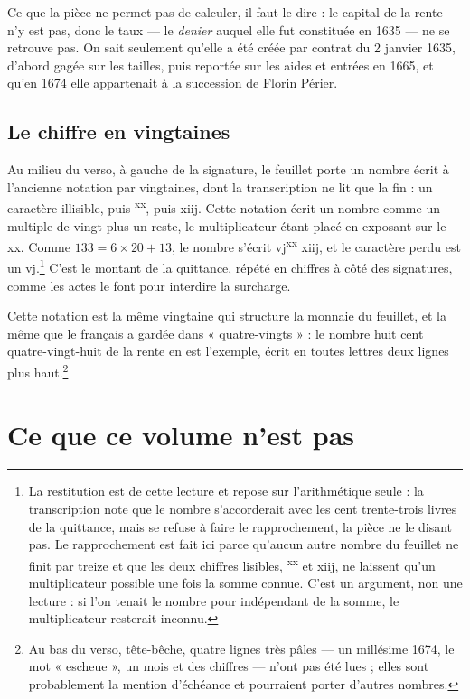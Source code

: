 \documentclass[11pt,a4paper]{article}
\begin{document}
Ce que la pièce ne permet pas de calculer, il faut le dire : le capital de la
rente n'y est pas, donc le taux — le \emph{denier} auquel elle fut constituée
en 1635 — ne se retrouve pas. On sait seulement qu'elle a été créée par
contrat du 2 janvier 1635, d'abord gagée sur les tailles, puis reportée sur
les aides et entrées en 1665, et qu'en 1674 elle appartenait à la succession
de Florin Périer.

\subsection*{Le chiffre en vingtaines}

Au milieu du verso, à gauche de la signature, le feuillet porte un nombre
écrit à l'ancienne notation par vingtaines, dont la transcription ne lit que
la fin : un caractère illisible, puis \textsuperscript{xx}, puis xiij. Cette
notation écrit un nombre comme un multiple de vingt plus un reste, le
multiplicateur étant placé en exposant sur le xx. Comme $133 = 6 \times 20 +
13$, le nombre s'écrit vj\textsuperscript{xx} xiij, et le caractère perdu est
un vj.\footnote{La restitution est de cette lecture et repose sur
l'arithmétique seule : la transcription note que le nombre s'accorderait avec
les cent trente-trois livres de la quittance, mais se refuse à faire le
rapprochement, la pièce ne le disant pas. Le rapprochement est fait ici parce
qu'aucun autre nombre du feuillet ne finit par treize et que les deux chiffres
lisibles, \textsuperscript{xx} et xiij, ne laissent qu'un multiplicateur
possible une fois la somme connue. C'est un argument, non une lecture : si
l'on tenait le nombre pour indépendant de la somme, le multiplicateur
resterait inconnu.} C'est le montant de la quittance, répété en chiffres à
côté des signatures, comme les actes le font pour interdire la surcharge.

Cette notation est la même vingtaine qui structure la monnaie du feuillet, et
la même que le français a gardée dans « quatre-vingts » : le nombre huit cent
quatre-vingt-huit de la rente en est l'exemple, écrit en toutes lettres deux
lignes plus haut.\footnote{Au bas du verso, tête-bêche, quatre lignes très
pâles — un millésime 1674, le mot « escheue », un mois et des chiffres — n'ont
pas été lues ; elles sont probablement la mention d'échéance et pourraient
porter d'autres nombres.}

\section*{Ce que ce volume n'est pas}
\end{document}

